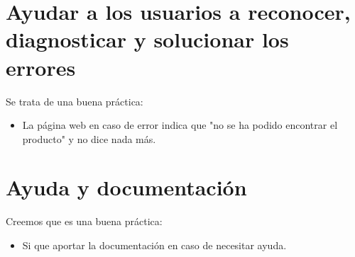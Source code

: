 \documentclass[openany,overnay,a4paper, twoside, 14pt]{book}
\begin{document}
\section*{Ayudar a los usuarios a reconocer, diagnosticar y solucionar los errores}
Se trata de una buena práctica:
\begin{itemize}
\item La página web en caso de error indica que "no se ha podido encontrar el producto" y no dice nada más.
\end{itemize}
\section*{Ayuda y documentación}
Creemos que es una buena práctica:
\begin{itemize}
    \item Si que aportar la documentación en caso de necesitar ayuda.
\end{itemize}
\end{document}
